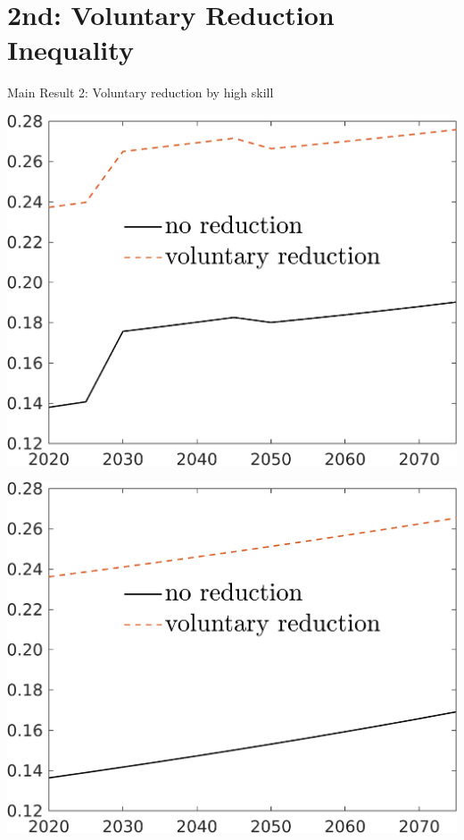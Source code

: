 \documentclass[11pt,aspectratio=169]{beamer}
\begin{document}
\section*{2nd: Voluntary Reduction Inequality}
\begin{frame}{Main Result 2: Voluntary reduction by high skill}
	\centering
	\begin{minipage}[]{0.32\textwidth}
		\includegraphics[width=1\textwidth]{../codding_model/own_basedOnFried/optimalPol_elastS_DisuSci/figures/all_1705/Single_OPT_T_NoTaus_taul_spillover0_sep1_BN1_ineq1_redCOMP_etaa0.79_lgd1.png}
	\end{minipage}
	\begin{minipage}[]{0.32\textwidth}
	\includegraphics[width=1\textwidth]{../codding_model/own_basedOnFried/optimalPol_elastS_DisuSci/figures/all_1705/Single_OPT_NOT_NoTaus_taul_spillover0_sep1_BN1_ineq1_redCOMP_etaa0.79_lgd1.png}

\end{minipage}
\end{frame}
\end{document}
